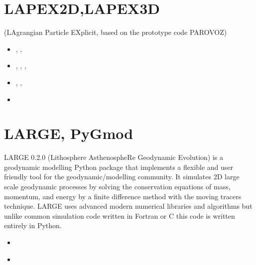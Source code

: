 \section{LAPEX2D,LAPEX3D}
(LAgrangian Particle EXplicit, based on the prototype code PAROVOZ) 

\begin{small}
\begin{itemize}
\item[\twothousandfive]      \textcite{sopg05},  \textcite{baso05},  \textcite{soba05}
\item[\twothousandsix]       \textcite{bube06},  \textcite{basv06},  \textcite{sobk06},
                             \textcite{peso06}
\item[\twothousandeight]     \textcite{peso08},  \textcite{baso08},  \textcite{scbe08}
\item[\twothousandeleven]    \textcite{sosk11}
\end{itemize}
\end{small}


\section{LARGE, PyGmod}

LARGE 0.2.0 (Lithosphere AsthenospheRe Geodynamic Evolution) is a geodynamic modelling
Python package that implements a flexible and user friendly tool for the 
geodynamic/modelling community. It simulates 2D large scale geodynamic processes by 
solving the conservation equations of mass, momentum, and energy by a finite difference
method with the moving tracers technique. LARGE uses advanced modern numerical libraries 
and algorithms but unlike common simulation code written in Fortran or C this code is 
written entirely in Python.

\begin{small}
\begin{itemize}
\item[\twothousandfifteen] \textcite{crvs15}
\item[\twothousandtwenty]  \textcite{crvi20}
\end{itemize}
\end{small}

